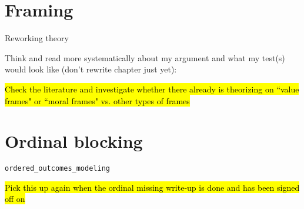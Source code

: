 \section*{Framing}
	\begin{coi}
		\item Reworking theory
			\begin{coi}
				\item Think and read more systematically about my argument and what my test(s) would look like (don't rewrite chapter just yet):
						\begin{coi}
							\item \hl{Check the literature and investigate whether there already is theorizing on ``value frames" or ``moral frames" vs. other types of frames}
						\end{coi}
			\end{coi}
	\end{coi} 

\section*{Ordinal blocking}
	\begin{coi}
		\item \texttt{ordered\_outcomes\_modeling}
			\begin{coi}
				\item \hl{Pick this up again when the ordinal missing write-up is done and has been signed off on}
			\end{coi}
	\end{coi}
	

	




